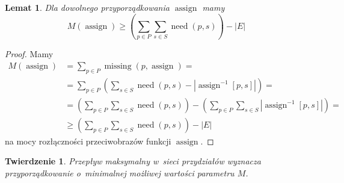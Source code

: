 \documentclass[12pt,a4paper]{article}
\newtheorem{lem}{Lemat}
\newtheorem{thm}{Twierdzenie}
\theoremstyle{definition}
\DeclareMathOperator{\need}{need}
\DeclareMathOperator{\assign}{assign}
\DeclareMathOperator{\missing}{missing}
\begin{document}
\begin{lem}
Dla dowolnego przyporządkowania $\assign$ mamy
$$ M(\assign) \geq \left( \sum_{p \in P} \sum_{s \in S} \need(p,s) \right)
- |E| $$
\end{lem}

\begin{proof}
Mamy
\begin{align*}
M(\assign) &= \sum_{p \in P} \missing(p, \assign) = \\
&= \sum_{p \in P} \left( \sum_{s \in S} \need(p,s) -
\left| \assign^{-1}[p,s] \right| \right) = \\
&= \left( \sum_{p \in P} \sum_{s \in S} \need(p,s) \right) -
\left(\sum_{p \in P} \sum_{s \in S} \left| \assign^{-1}[p,s] \right|\right) = \\
&\geq \left( \sum_{p \in P} \sum_{s \in S} \need(p,s) \right) - |E|
\end{align*}
na mocy rozłączności przeciwobrazów funkcji $\assign$.
\end{proof}

\begin{thm}
Przepływ maksymalny w~sieci przydziałów wyznacza przyporządkowanie o~minimalnej
możliwej wartości parametru $M$. 
\end{thm}
\end{document}
